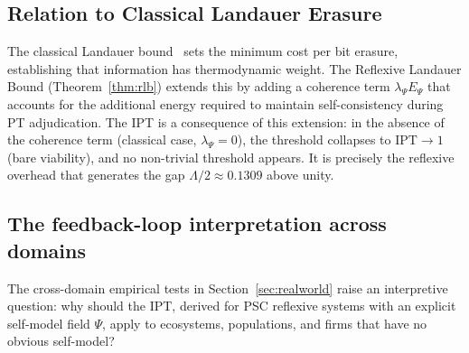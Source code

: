 \documentclass[11pt,twocolumn]{article}
\theoremstyle{remark}
\begin{document}
\subsection{Relation to Classical Landauer Erasure}
\label{sec:discussion:landauer}

The classical Landauer bound~\cite{Landauer1961,bennett1973logical}
sets the minimum cost per bit erasure, establishing that information
has thermodynamic weight. The Reflexive Landauer Bound
(Theorem~\ref{thm:rlb}) extends this by adding a coherence term
$\lambda_\Psi E_\Psi$ that accounts for the additional energy
required to maintain self-consistency during PT adjudication. The
IPT is a consequence of this extension: in the absence of the
coherence term (classical case, $\lambda_\Psi = 0$), the threshold
collapses to $\mathrm{IPT} \to 1$ (bare viability), and no
non-trivial threshold appears. It is precisely the reflexive overhead
that generates the gap $\Lambda/2 \approx 0.1309$ above unity.

\subsection{The feedback-loop interpretation across domains}
\label{sec:discussion:biology}

The cross-domain empirical tests in Section~\ref{sec:realworld} raise
an interpretive question: why should the IPT, derived for PSC reflexive
systems with an explicit self-model field $\Psi$, apply to ecosystems,
populations, and firms that have no obvious self-model?
\end{document}
